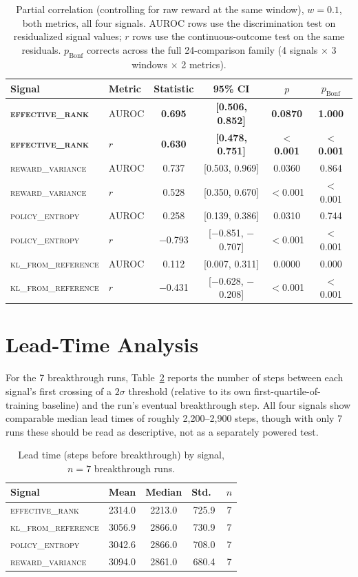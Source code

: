 \documentclass{article}
\newcommand{\erank}{\textsc{effective\_rank}}
\newcommand{\pentropy}{\textsc{policy\_entropy}}
\newcommand{\klref}{\textsc{kl\_from\_reference}}
\newcommand{\rvar}{\textsc{reward\_variance}}
\begin{document}
\begin{table}[h]
\centering
\caption{Partial correlation (controlling for raw reward at the same window),
$w{=}0.1$, both metrics, all four signals. AUROC rows use the discrimination
test on residualized signal values; $r$ rows use the continuous-outcome test
on the same residuals. $p_{\text{Bonf}}$ corrects across the full 24-comparison
family (4 signals $\times$ 3 windows $\times$ 2 metrics).}
\label{tab:full-partial}
\begin{tabular}{llcccc}
\toprule
Signal & Metric & Statistic & 95\% CI & $p$ & $p_{\text{Bonf}}$ \\
\midrule
\textbf{\erank} & AUROC & \textbf{0.695} & \textbf{[0.506, 0.852]} & \textbf{0.0870} & \textbf{1.000} \\
\textbf{\erank} & $r$ & \textbf{0.630} & \textbf{[0.478, 0.751]} & \textbf{$<$0.001} & \textbf{$<$0.001} \\
\rvar & AUROC & 0.737 & [0.503, 0.969] & 0.0360 & 0.864 \\
\rvar & $r$ & 0.528 & [0.350, 0.670] & $<$0.001 & $<$0.001 \\
\pentropy & AUROC & 0.258 & [0.139, 0.386] & 0.0310 & 0.744 \\
\pentropy & $r$ & $-$0.793 & [$-$0.851, $-$0.707] & $<$0.001 & $<$0.001 \\
\klref & AUROC & 0.112 & [0.007, 0.311] & 0.0000 & 0.000 \\
\klref & $r$ & $-$0.431 & [$-$0.628, $-$0.208] & $<$0.001 & $<$0.001 \\
\bottomrule
\end{tabular}
\end{table}

\section{Lead-Time Analysis}
\label{app:leadtime}

For the 7 breakthrough runs, Table~\ref{tab:leadtime} reports the number of
steps between each signal's first crossing of a $2\sigma$ threshold (relative
to its own first-quartile-of-training baseline) and the run's eventual
breakthrough step. All four signals show comparable median lead times of
roughly 2,200--2,900 steps, though with only 7 runs these should be read as
descriptive, not as a separately powered test.

\begin{table}[h]
\centering
\caption{Lead time (steps before breakthrough) by signal, $n{=}7$ breakthrough
runs.}
\label{tab:leadtime}
\begin{tabular}{lcccc}
\toprule
Signal & Mean & Median & Std.\ & $n$ \\
\midrule
\erank & 2314.0 & 2213.0 & 725.9 & 7 \\
\klref & 3056.9 & 2866.0 & 730.9 & 7 \\
\pentropy & 3042.6 & 2866.0 & 708.0 & 7 \\
\rvar & 3094.0 & 2861.0 & 680.4 & 7 \\
\bottomrule
\end{tabular}
\end{table}
\end{document}
